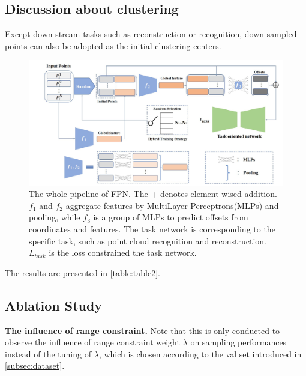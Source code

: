 \documentclass[a4paper,10pt]{article}
\begin{document}
\begin{multicols}{2}
\subsection{Discussion about clustering}
Except down-stream tasks such as reconstruction or recognition, down-sampled points can also be adopted as the initial clustering centers.
\begin{figure}
\centering
 \includegraphics[width=\linewidth]{images/fig2.png}
 \captionsetup{justification=justified, labelsep=period}
 \caption{The whole pipeline of FPN. The + denotes element-wised addition. $f_1$ and $f_2$ aggregate features by MultiLayer Perceptrons(MLPs) and pooling, while $f_3$ is a group of MLPs to predict offsets from coordinates and features. The task network is corresponding to the speciﬁc task, such as point cloud recognition and reconstruction. $L_{task}$ is the loss constrained the task network.}
\label{fig:fig2}
\end{figure}


The results are presented in \autoref{table:table2}.

\subsection{Ablation Study}
\textbf{The influence of range constraint.} Note that this is only conducted to observe the inﬂuence of range constraint weight $\lambda$ on sampling performances instead of the tuning of $\lambda$, which is chosen according to the val set introduced in \autoref{subsec:dataset}.


\end{multicols}
\end{document}
